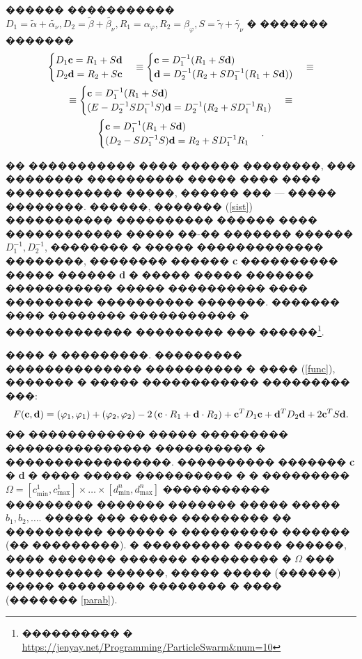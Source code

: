 \documentclass[a4paper]{article}
\begin{document}
������ ����������� $D_1=\tilde{\alpha}+\tilde{\alpha_{\nu}}, D_2=\tilde{\beta}+\tilde{\beta_{\nu}}, R_1=\alpha_{\varphi}, R_2= \beta_{\varphi}, S=\tilde{\gamma}+\tilde{\gamma_{\nu}}$
� ������� �������
\begin{multline}
  \begin{cases}
    D_1 {\bf c}= R_1 + S{\bf d} \\
    D_2 {\bf d}= R_2 + S{\bf c}
  \end{cases}\equiv
  \begin{cases}
    {\bf c}=D_1^{-1} (R_1 + S{\bf d}) \\
    {\bf d}= D_2^{-1}(R_2 + SD_1^{-1} (R_1 + S{\bf d}))
  \end{cases}\equiv\\
  \equiv
  \begin{cases}
    {\bf c}=D_1^{-1} (R_1 + S{\bf d}) \\
    (E-D_2^{-1}SD_1^{-1}S) {\bf d}= D_2^{-1}(R_2 + SD_1^{-1} R_1)
  \end{cases}
  \equiv\\
  \begin{cases}
    {\bf c}=D_1^{-1} (R_1 + S{\bf d}) \\
    (D_2-SD_1^{-1}S) {\bf d}=R_2 + SD_1^{-1} R_1
  \end{cases}.
  \label{sist}
\end{multline}

�� ����������� ���� ������ ��������, ��� �������� ���������� ����� ���� ���� ������������ �����, ������ ��� --- ����� ��������.
������, ������� (\ref{sist}) ����������� ���������� ������ ���� ������������ ����� ��-�� ������� ������ $D_1^{-1}, D_2^{-1}$, �������� � ����� ������������� ��������, ��������
������ {\bf c} ���������� ����� ������ {\bf d} � ����� ����� ������� ����������� ����� ���������� ���� ��������� ���������� �������.
������� ���� �������� ����������� � ������������� ��������� ��� ������\footnote{���������� � \url{https://jenyay.net/Programming/ParticleSwarm&num=10}}.

���� � ���������. ��������� �������������� ���������� � ���� (\ref{func}), ������� � ����� ������������ ��������� ���:
\begin{equation}
  F({\bf c},{\bf d})=(\varphi_1,\varphi_1)+(\varphi_2,\varphi_2)-2\left({\bf c}\cdot R_1+{\bf d}\cdot R_2\right)+
  {\bf c}^T D_1 {\bf c}+{\bf d}^T D_2 {\bf d}+2{\bf c}^T S {\bf d}.
\end{equation}
�� ������������ ����� ��������� ��������������� ���������� � �����������������.
���������� ������� {\bf c} � {\bf d} � ���� ����� ���������� � � ��������� $\Omega=[c^1_{\min},c^1_{\max}] \times \dots \times [d^n_{\min},d^n_{\max}]$
����������� ��������� ������� ������� ����� ����� $b_1, b_2, \dots$.
����� ��� ����� ��������� �� ���������� ������ � ���������� ������� (�� ���������).
� ��������� ����� ������, ���� ������� ������� ��������� � $\Omega$ ��� ���������� ������, ����� ����� (������) ����� ��������� �������� � ���� (������� \ref{parab}).
\end{document}
